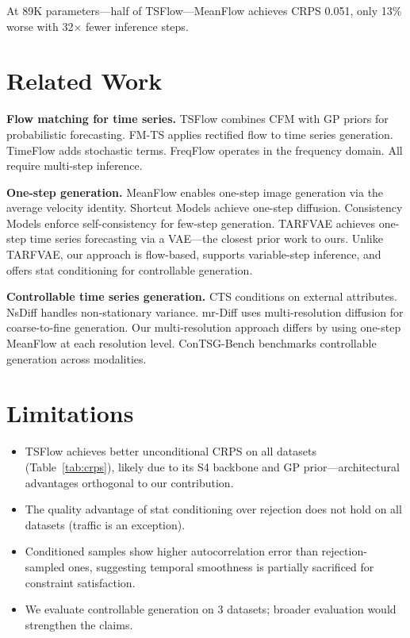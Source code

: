 \documentclass{article}
\begin{document}
At 89K parameters---half of TSFlow---MeanFlow achieves CRPS 0.051, only 13\% worse with 32$\times$ fewer inference steps.

\section{Related Work}

\textbf{Flow matching for time series.} TSFlow \citep{kollovieh2024tsflow} combines CFM with GP priors for probabilistic forecasting. FM-TS \citep{flmts2024} applies rectified flow to time series generation. TimeFlow \citep{timeflow2025} adds stochastic terms. FreqFlow \citep{freqflow2025} operates in the frequency domain. All require multi-step inference.

\textbf{One-step generation.} MeanFlow \citep{geng2025meanflow} enables one-step image generation via the average velocity identity. Shortcut Models \citep{frans2025shortcut} achieve one-step diffusion. Consistency Models \citep{song2023consistency} enforce self-consistency for few-step generation. TARFVAE \citep{tarfvae2025} achieves one-step time series forecasting via a VAE---the closest prior work to ours. Unlike TARFVAE, our approach is flow-based, supports variable-step inference, and offers stat conditioning for controllable generation.

\textbf{Controllable time series generation.} CTS \citep{cts2024} conditions on external attributes. NsDiff \citep{nsdiff2025} handles non-stationary variance. mr-Diff \citep{kollovieh2024mrdiff} uses multi-resolution diffusion for coarse-to-fine generation. Our multi-resolution approach differs by using one-step MeanFlow at each resolution level. ConTSG-Bench \citep{contsg2026} benchmarks controllable generation across modalities.

\section{Limitations}

\begin{itemize}
    \item TSFlow achieves better unconditional CRPS on all datasets (Table~\ref{tab:crps}), likely due to its S4 backbone and GP prior---architectural advantages orthogonal to our contribution.
    \item The quality advantage of stat conditioning over rejection does not hold on all datasets (traffic is an exception).
    \item Conditioned samples show higher autocorrelation error than rejection-sampled ones, suggesting temporal smoothness is partially sacrificed for constraint satisfaction.
    \item We evaluate controllable generation on 3 datasets; broader evaluation would strengthen the claims.
\end{itemize}
\end{document}
